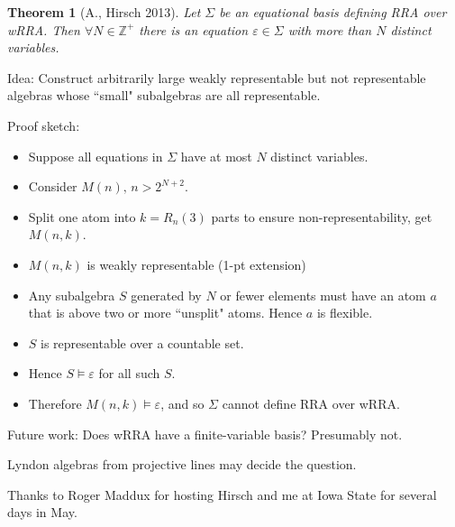 \documentclass[10pt, handout]{beamer}
\renewcommand{\1}{1^\text{'}}
\newcommand{\0}{0^\text{'}}
\newtheorem{thm}{Theorem}
\begin{document}

\frame
{
\begin{thm}[A., Hirsch 2013]
   Let $\Sigma$ be an equational basis defining RRA over wRRA.  Then $\forall N\in\mathbb{Z}^+$ there is an equation $\varepsilon\in\Sigma$ with more than $N$ distinct variables.


\end{thm}

\pause
   Idea: Construct arbitrarily large weakly representable but not representable algebras whose ``small" subalgebras are all representable.
}




\frame
{
Proof sketch:
\begin{itemize}
  \item Suppose all equations in $\Sigma$ have at most $N$ distinct variables.
  \pause
  \item Consider $M(n),\, n>2^{N+2}$.
  \item Split one atom into $k=R_n(3)$ parts to ensure non-representability, get $M(n,k)$.
  \pause
  \item $M(n,k)$ is weakly representable (1-pt extension)
  \pause
  \item Any subalgebra $S$ generated by $N$ or fewer elements must have an atom $a$ that is above two or more ``unsplit" atoms.  Hence $a$ is flexible.
  \pause
  \item $S$ is representable over a countable set.
  \pause
  \item Hence $S \models\varepsilon$ for all such $S$.
  \item Therefore $M(n,k)\models \varepsilon$, and so $\Sigma$ cannot define RRA over wRRA.
\end{itemize}
}




\frame
{Future work:
Does wRRA have a finite-variable basis?  Presumably not.

\bigskip

Lyndon algebras from projective lines may decide the question.

}


\frame
{

Thanks to Roger Maddux for hosting Hirsch and me at Iowa State for several days in May.

}


















 
\end{document}
